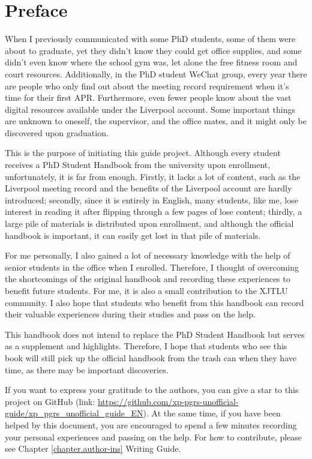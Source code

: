\chapter{Preface}
\thispagestyle{empty}
When I previously communicated with some PhD students, some of them were about to graduate, yet they didn't know they could get office supplies, and some didn't even know where the school gym was, let alone the free fitness room and court resources. Additionally, in the PhD student WeChat group, every year there are people who only find out about the meeting record requirement when it's time for their first APR. Furthermore, even fewer people know about the vast digital resources available under the Liverpool account. Some important things are unknown to oneself, the supervisor, and the office mates, and it might only be discovered upon graduation.

This is the purpose of initiating this guide project. Although every student receives a PhD Student Handbook from the university upon enrollment, unfortunately, it is far from enough. Firstly, it lacks a lot of content, such as the Liverpool meeting record and the benefits of the Liverpool account are hardly introduced; secondly, since it is entirely in English, many students, like me, lose interest in reading it after flipping through a few pages of lose content; thirdly, a large pile of materials is distributed upon enrollment, and although the official handbook is important, it can easily get lost in that pile of materials.

For me personally, I also gained a lot of necessary knowledge with the help of senior students in the office when I enrolled. Therefore, I thought of overcoming the shortcomings of the original handbook and recording these experiences to benefit future students. For me, it is also a small contribution to the XJTLU community. I also hope that students who benefit from this handbook can record their valuable experiences during their studies and pass on the help.

This handbook does not intend to replace the PhD Student Handbook but serves as a supplement and highlights. Therefore, I hope that students who see this book will still pick up the official handbook from the trash can when they have time, as there may be important discoveries.

If you want to express your gratitude to the authors, you can give a star to this project on GitHub (link: \url{https://github.com/xp-pgrs-unofficial-guide/xp_pgrs_unofficial_guide_EN}). At the same time, if you have been helped by this document, you are encouraged to spend a few minutes recording your personal experiences and passing on the help. For how to contribute, please see Chapter \ref{chapter.author-ins} Writing Guide.

